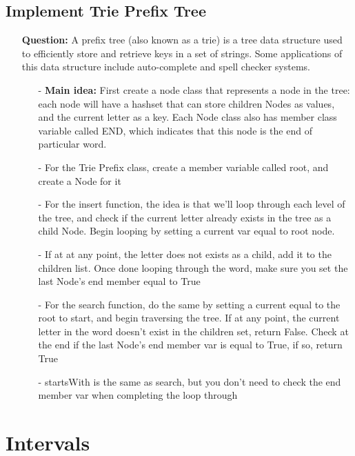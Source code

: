\documentclass[12pt]{article}
\begin{document}
\subsection{Implement Trie Prefix Tree}
\begin{enumerate}
  \item[] \textbf{Question:} A prefix tree (also known as a trie) is a tree data structure used to efficiently store and retrieve keys in a set of strings. Some applications of this data structure include auto-complete and spell checker systems.

    \begin{enumerate}
      \item[-] \textbf{Main idea:} First create a node class that represents a node in the tree: each node will have a hashset that can store children Nodes as values, and the current letter as a key. Each Node class also has member class variable called END, which indicates that this node is the end of particular word.
      \item[-] For the Trie Prefix class, create a member variable called root, and create a Node for it
      \item[-] For the insert function, the idea is that we'll loop through each level of the tree, and check if the current letter already exists in the tree as a child Node. Begin looping by setting a current var equal to root node. 
      \item[-] If at at any point, the letter does not exists as a child, add it to the children list. Once done looping through the word, make sure you set the last Node's end member equal to True
      \item[-] For the search function, do the same by setting a current equal to the root to start, and begin traversing the tree. If at any point, the current letter in the word doesn't exist in the children set, return False. Check at the end if the last Node's end member var is equal to True, if so, return True
      \item[-] startsWith is the same as search, but you don't need to check the end member var when completing the loop through

    \end{enumerate}
\end{enumerate}


\section{Intervals}
\end{document}
